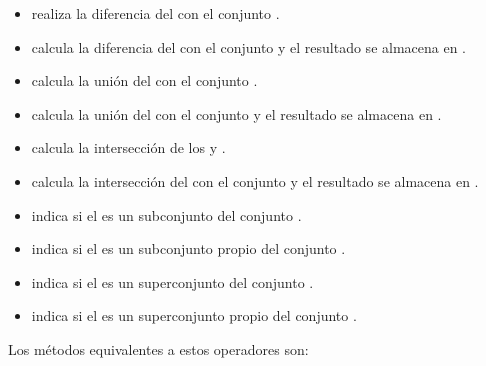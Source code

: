 \begin{itemize}
\item {} realiza la diferencia del  con el conjunto .

\item {} calcula la diferencia del  con el conjunto  y el resultado se almacena en .

\item {} calcula la unión del  con el conjunto .

\item {} calcula la unión del  con el conjunto  y el resultado se almacena en .

\item {} calcula la intersección de los  y .

\item {} calcula la intersección del  con el conjunto  y el resultado se almacena en .

\item {} indica si el  es un subconjunto del conjunto .

\item {} indica si el  es un subconjunto propio del conjunto .

\item {} indica si el  es un superconjunto del conjunto .

\item {} indica si el  es un superconjunto propio del conjunto .
\end{itemize}


Los métodos equivalentes a estos operadores son:


